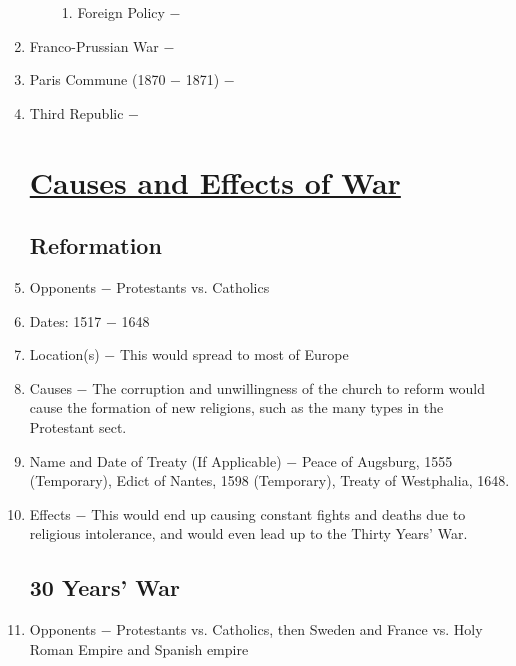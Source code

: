 \documentclass[12pt]{article}
\begin{document}
\begin{enumerate}
\begin{enumerate}[label=\arabic{*}.]
\begin{enumerate}[label=\arabic{*}.]
\item Foreign Policy $-$

\end{enumerate}
\end{enumerate}
\setcounter{enumi}{545}


\item Franco-Prussian War $-$

\item Paris Commune (1870 $-$ 1871) $-$ 

\item Third Republic $-$


\section{\underline{Causes and Effects of War}}

\subsection{Reformation} 

\item Opponents $-$ Protestants vs. Catholics

\item Dates: 1517 $-$ 1648

\item Location(s) $-$ This would spread to most of Europe

\item Causes $-$ The corruption and unwillingness of the church to reform would cause the formation of new religions, such as the many types in the Protestant sect.

\item Name and Date of Treaty (If Applicable) $-$ Peace of Augsburg, 1555 (Temporary), Edict of Nantes, 1598 (Temporary), Treaty of Westphalia, 1648.

\item Effects $-$ This would end up causing constant fights and deaths due to religious intolerance, and would even lead up to the Thirty Years' War.

\subsection{30 Years' War}

\item Opponents $-$ Protestants vs. Catholics, then Sweden and France vs. Holy Roman Empire and Spanish empire 


\end{enumerate}
\end{document}
